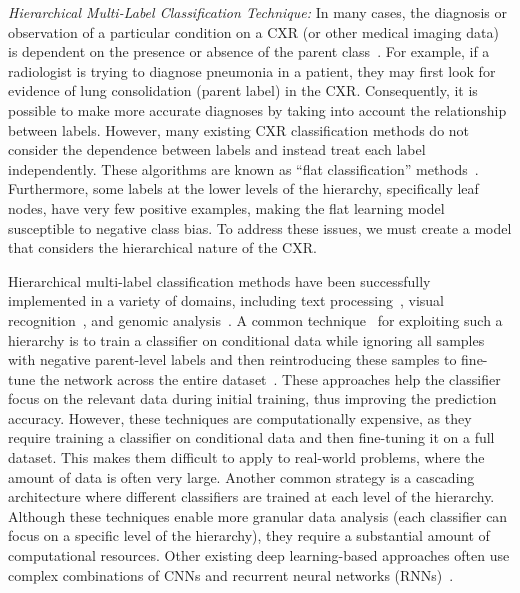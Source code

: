 \documentclass[final,1p,times,authoryear]{elsarticle}
\begin{document}
\textit{Hierarchical Multi-Label Classification Technique: }
In many cases, the diagnosis or observation of a particular condition on a CXR (or other medical imaging data) is dependent on the presence or absence of the parent class~\cite{vaneeden_Relationship_2012}. For example, if a radiologist is trying to diagnose pneumonia in a patient, they may first look for evidence of lung consolidation (parent label) in the CXR\@. Consequently, it is possible to make more accurate diagnoses by taking into account the relationship between labels\@. However, many existing CXR classification methods do not consider the dependence between labels and instead treat each label independently. These algorithms are known as ``flat classification'' methods~\cite{alaydie_Exploiting_2012}. Furthermore, some labels at the lower levels of the hierarchy, specifically leaf nodes, have very few positive examples, making the flat learning model susceptible to negative class bias. To address these issues, we must create a model that considers the hierarchical nature of the CXR\@.

Hierarchical multi-label classification methods have been successfully implemented in a variety of domains, including text processing~\cite{aly_Hierarchical_2019}, visual recognition~\cite{bi_Mandatory_2014}, and genomic analysis~\cite{bi_BayesOptimal_2015}. A common technique~\cite{chen_Deep_2019} for exploiting such a hierarchy is to train a classifier on conditional data while ignoring all samples with negative parent-level labels and then reintroducing these samples to fine-tune the network across the entire dataset~\cite{chen_Deep_2019}. These approaches help the classifier focus on the relevant data during initial training, thus improving the prediction accuracy.  However, these techniques are computationally expensive, as they require training a classifier on conditional data and then fine-tuning it on a full dataset. This makes them difficult to apply to real-world problems, where the amount of data is often very large.   Another common strategy is a cascading architecture where different classifiers are trained at each level of the hierarchy. Although these techniques enable more granular data analysis (each classifier can focus on a specific level of the hierarchy), they require a substantial amount of computational resources. Other existing deep learning-based approaches often use complex combinations of CNNs and recurrent neural networks (RNNs)~\cite{guo_CNNRNN_2018,kowsari_HDLTex_2017}.
\end{document}

